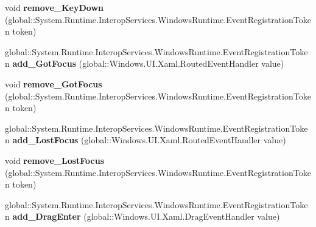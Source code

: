 \begin{DoxyCompactItemize}
\item 
\mbox{\label{interface_windows_1_1_u_i_1_1_xaml_1_1_i_u_i_element_ae7fc7bcada32e7e554fd3685ee2e4022}} 
void {\bfseries remove\+\_\+\+Key\+Down} (global\+::\+System.\+Runtime.\+Interop\+Services.\+Windows\+Runtime.\+Event\+Registration\+Token token)
\item 
\mbox{\label{interface_windows_1_1_u_i_1_1_xaml_1_1_i_u_i_element_a96e9e3b3d2456f96d2113018911c4223}} 
global\+::\+System.\+Runtime.\+Interop\+Services.\+Windows\+Runtime.\+Event\+Registration\+Token {\bfseries add\+\_\+\+Got\+Focus} (global\+::\+Windows.\+U\+I.\+Xaml.\+Routed\+Event\+Handler value)
\item 
\mbox{\label{interface_windows_1_1_u_i_1_1_xaml_1_1_i_u_i_element_ac7da9e77287c0c2d8bdfd22d90914fb3}} 
void {\bfseries remove\+\_\+\+Got\+Focus} (global\+::\+System.\+Runtime.\+Interop\+Services.\+Windows\+Runtime.\+Event\+Registration\+Token token)
\item 
\mbox{\label{interface_windows_1_1_u_i_1_1_xaml_1_1_i_u_i_element_a8eff735911e4175474bbec6b8aa79b15}} 
global\+::\+System.\+Runtime.\+Interop\+Services.\+Windows\+Runtime.\+Event\+Registration\+Token {\bfseries add\+\_\+\+Lost\+Focus} (global\+::\+Windows.\+U\+I.\+Xaml.\+Routed\+Event\+Handler value)
\item 
\mbox{\label{interface_windows_1_1_u_i_1_1_xaml_1_1_i_u_i_element_a735a5482f18ebef41ee23b3508022834}} 
void {\bfseries remove\+\_\+\+Lost\+Focus} (global\+::\+System.\+Runtime.\+Interop\+Services.\+Windows\+Runtime.\+Event\+Registration\+Token token)
\item 
\mbox{\label{interface_windows_1_1_u_i_1_1_xaml_1_1_i_u_i_element_a2fed84aaafd99d2ab6c95997a486fc7a}} 
global\+::\+System.\+Runtime.\+Interop\+Services.\+Windows\+Runtime.\+Event\+Registration\+Token {\bfseries add\+\_\+\+Drag\+Enter} (global\+::\+Windows.\+U\+I.\+Xaml.\+Drag\+Event\+Handler value)
\item 
\mbox{\label{interface_windows_1_1_u_i_1_1_xaml_1_1_i_u_i_element_a5a5960af1b1feea08a32346a9df72973}} 

\end{DoxyCompactItemize}
